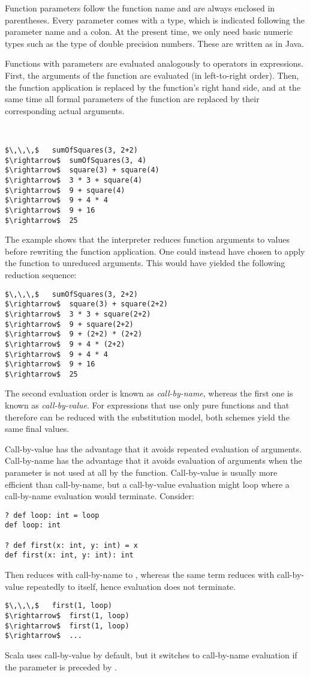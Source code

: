 \documentclass[a4paper,12pt,twoside,titlepage]{book}
\begin{document}
Function parameters follow the function name and are always enclosed
in parentheses.  Every parameter comes with a type, which is indicated
following the parameter name and a colon. At the present time, we only
need basic numeric types such as the type  of double
precision numbers. These are written as in Java.

Functions with parameters are evaluated analogously to operators in
expressions. First, the arguments of the function are evaluated (in
left-to-right order). Then, the function application is replaced by
the function's right hand side, and at the same time all formal
parameters of the function are replaced by their corresponding actual
arguments.

\example\ 
 
\begin{lstlisting}
$\,\,\,$   sumOfSquares(3, 2+2)
$\rightarrow$  sumOfSquares(3, 4)
$\rightarrow$  square(3) + square(4)
$\rightarrow$  3 * 3 + square(4)
$\rightarrow$  9 + square(4)
$\rightarrow$  9 + 4 * 4
$\rightarrow$  9 + 16
$\rightarrow$  25
\end{lstlisting}

The example shows that the interpreter reduces function arguments to
values before rewriting the function application.  One could instead
have chosen to apply the function to unreduced arguments. This would
have yielded the following reduction sequence:
\begin{lstlisting}
$\,\,\,$   sumOfSquares(3, 2+2)
$\rightarrow$  square(3) + square(2+2)
$\rightarrow$  3 * 3 + square(2+2)
$\rightarrow$  9 + square(2+2)
$\rightarrow$  9 + (2+2) * (2+2)
$\rightarrow$  9 + 4 * (2+2)
$\rightarrow$  9 + 4 * 4
$\rightarrow$  9 + 16
$\rightarrow$  25
\end{lstlisting}

The second evaluation order is known as \emph{call-by-name},
whereas the first one is known as \emph{call-by-value}.  For
expressions that use only pure functions and that therefore can be
reduced with the substitution model, both schemes yield the same final
values.  

Call-by-value has the advantage that it avoids repeated evaluation of
arguments. Call-by-name has the advantage that it avoids evaluation of
arguments when the parameter is not used at all by the function.
Call-by-value is usually more efficient than call-by-name, but a
call-by-value evaluation might loop where a call-by-name evaluation
would terminate. Consider:
\begin{lstlisting}
? def loop: int = loop
def loop: int

? def first(x: int, y: int) = x
def first(x: int, y: int): int
\end{lstlisting}
Then  reduces with call-by-name to ,
whereas the same term reduces with call-by-value repeatedly to itself,
hence evaluation does not terminate.
\begin{lstlisting}
$\,\,\,$   first(1, loop)
$\rightarrow$  first(1, loop)
$\rightarrow$  first(1, loop)
$\rightarrow$  ...
\end{lstlisting}
Scala uses call-by-value by default, but it switches to call-by-name evaluation
if the parameter is preceded by .
\end{document}
